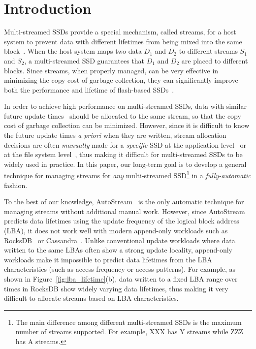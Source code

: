 \section{Introduction}
Multi-streamed SSDs provide a special mechanism,
called streams, for a host system to prevent data with different lifetimes 
from being mixed into the same block~\cite{T10, MultiStream}.
When the host system maps two data $D_1$ and $D_2$ to 
different streams $S_1$ and $S_2$, a multi-streamed SSD guarantees that 
$D_1$ and $D_2$ are placed to different blocks.   
Since streams, when properly managed, can be very effective in minimizing 
the copy cost of garbage collection, they
can significantly improve both the performance and lifetime of 
flash-based SSDs~\cite{MultiStream, FStream, AutoStream, Level}.

In order to achieve high performance on multi-streamed SSDs, data with similar 
future update times~\cite{PCHa}
should be allocated 
to the same stream, so that the copy cost of garbage collection can be minimized.
However, since it is difficult to know the future update times {\it a priori} when they are written,
stream allocation decisions are often {\it manually} made for a {\it specific} SSD 
at the application level~\cite{MultiStream} or at the file system level~\cite{FStream}, 
thus making it difficult for multi-streamed SSDs to be widely used in practice.  
In this paper, our long-term goal is to develop a general technique for managing streams 
for {\it any} multi-streamed SSD\footnote{The main difference among different multi-streamed 
SSDs is the maximum number of streams supported.  
For example, XXX has Y streams while ZZZ has A streams.} in a {\it fully-automatic} fashion. 

To the best of our knowledge, AutoStream~\cite{AutoStream} is the only automatic technique 
for managing streams without additional manual work.  
However, since AutoStream predicts data lifetimes using the update frequency 
of the logical block address (LBA), it does not work well with modern append-only workloads 
such as RocksDB~\cite{RocksDB} or Cassandra~\cite{Cassandra}.  
Unlike conventional update workloads where data written to the same LBAs 
often show a strong update locality, 
append-only workloads make it impossible to predict data lifetimes 
from the LBA characteristics (such as access frequency or access patterns).  
For example, as shown in Figure~\ref{fig:lba_lifetime}(b), 
data written to a fixed LBA range over times in RocksDB 
show widely varying data lifetimes, 
thus making it very difficult to allocate streams based on LBA characteristics.

